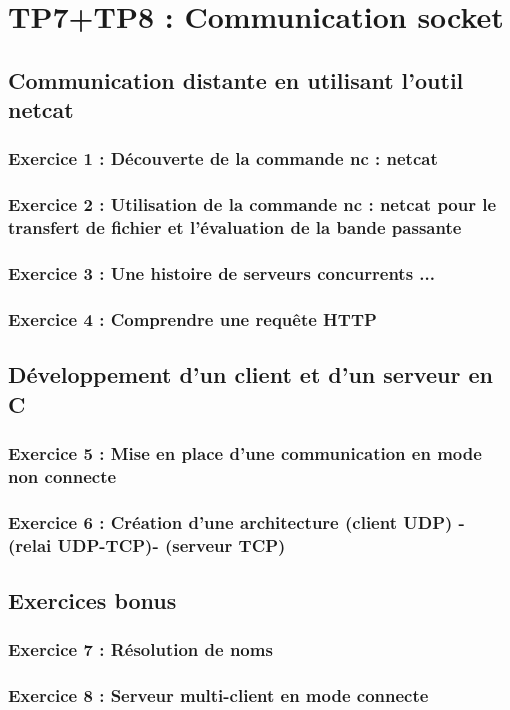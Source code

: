 \chapter{TP7+TP8 : Communication socket}

\section{Communication distante en utilisant l’outil netcat}

\subsection{Exercice 1 : Découverte de la commande nc : netcat}

\subsection{Exercice 2 : Utilisation de la commande nc : netcat pour le transfert de fichier et l’évaluation de
la bande passante}

\subsection{Exercice 3 : Une histoire de serveurs concurrents ...}

\subsection{Exercice 4 : Comprendre une requête HTTP}

\section{Développement d’un client et d’un serveur en C}

\subsection{Exercice 5 : Mise en place d’une communication en mode non connecte}

\subsection{Exercice 6 : Création d’une architecture (client UDP) - (relai UDP-TCP)- (serveur TCP)}

\section{Exercices bonus}

\subsection{Exercice 7 : Résolution de noms}

\subsection{Exercice 8 : Serveur multi-client en mode connecte}
